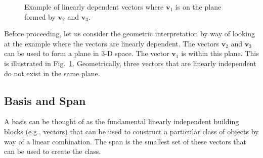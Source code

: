 \begin{figure}[tb!]
\begin{center}
\caption{Example of linearly dependent vectors where $\mathbf{v}_1$ is on the plane formed by $\mathbf{v}_2$ and $\mathbf{v}_3$.}
\label{Fig:linearAlgebra_linearIndepndenceGeometric_example}
\end{center}
\end{figure}

Before proceeding, let us consider the geometric interpretation by way of looking at the example where the vectors are linearly dependent. The vectors $\mathbf{v}_2$ and $\mathbf{v}_3$ can be used to form a plane in 3-D space. The vector $\mathbf{v}_1$ is within this plane. This is illustrated in Fig.~\ref{Fig:linearAlgebra_linearIndepndenceGeometric_example}. Geometrically, three vectors that are linearly independent do not exist in the same plane.

\subsection{Basis and Span}

A basis can be thought of as the fundamental linearly independent building blocks (e.g., vectors) that can be used to construct a particular class of objects by way of a linear combination. The span is the smallest set of these vectors that can be used to create the class.


